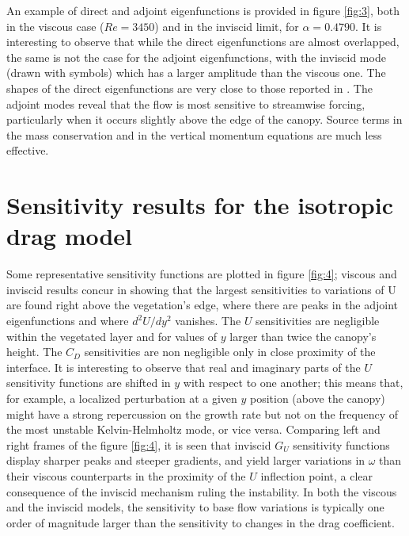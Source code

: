 An example of direct and adjoint eigenfunctions is provided in figure \ref{fig:3}, both in the viscous case
($Re = 3450$) and in the inviscid limit, for $\alpha = 0.4790$. It is interesting to observe that while the
direct eigenfunctions are almost overlapped, the same is not the case for the adjoint eigenfunctions,
with the inviscid mode (drawn with symbols) which has a larger amplitude than the viscous one.
The shapes of the direct eigenfunctions are very close to those reported in \citet{zampogna2016instability}. The adjoint modes
reveal that the flow is most sensitive to streamwise forcing, particularly when it occurs slightly
above the edge of the canopy. Source terms in the mass conservation and in the vertical momentum
equations are much less effective.


\section{Sensitivity results for the isotropic drag model}
\label{sec:3}

Some representative sensitivity functions are plotted in figure \ref{fig:4}; viscous and inviscid results
concur in showing that the largest sensitivities to variations of U are found right above the vegetation’s edge, where there are peaks in the adjoint eigenfunctions and where $d^2 U/d y^2$ vanishes. The
$U$ sensitivities are negligible within the vegetated layer and for values of $y$ larger than twice the
canopy’s height. The $C_D$ sensitivities are non negligible only in close proximity of the interface.
It is interesting to observe that real and imaginary parts of the $U$ sensitivity functions are
shifted in $y$ with respect to one another; this means that, for example, a localized perturbation at
a given $y$ position (above the canopy) might have a strong repercussion on the growth rate but not
on the frequency of the most unstable Kelvin-Helmholtz mode, or vice versa. Comparing left and
right frames of the figure \ref{fig:4}, it is seen that inviscid $G_U$ sensitivity functions display sharper peaks and
steeper gradients, and yield larger variations in $\omega$ than their viscous counterparts in the proximity of
the $U$ inflection point, a clear consequence of the inviscid mechanism ruling the instability. In both
the viscous and the inviscid models, the sensitivity to base flow variations is typically one order of
magnitude larger than the sensitivity to changes in the drag coefficient.

